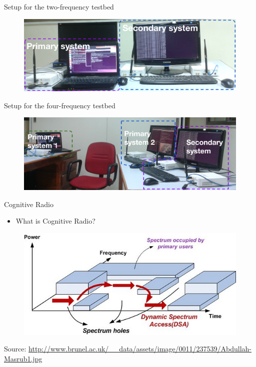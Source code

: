 \documentclass{beamer}
\begin{document}
  \begin{frame}{Setup for the two-frequency testbed}
    \begin{figure}
      \centering
      \includegraphics[width=\linewidth]{img/freq2}
    \end{figure}
  \end{frame}
  
  \begin{frame}{Setup for the four-frequency testbed}
    \begin{figure}
      \centering
      \includegraphics[width=\linewidth]{img/freq4}
    \end{figure}
  \end{frame}
    
  \begin{frame}{Cognitive Radio}
    \begin{minipage}[t][0.8\textheight][t]{\textwidth}
      \begin{itemize}
        \item What is Cognitive Radio?
      \end{itemize}
      \begin{figure}
        \centering
        \includegraphics[width=\linewidth]{img/freqUtil}
      \end{figure}
      \vfill
      \tiny{Source: \url{http://www.brunel.ac.uk/\_\_data/assets/image/0011/237539/Abdullah-Masrub1.jpg}}
    \end{minipage}
  \end{frame}
\end{document}
